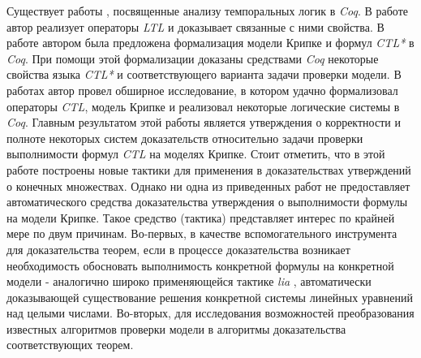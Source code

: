 \documentclass[12pt]{article}
\begin{document}
Существует работы \cite{2007}\cite{thesis}\cite{2003}, посвященные анализу темпоральных логик в \textit{Coq}.
В работе \cite{2003} автор реализует операторы \textit{LTL} и доказывает связанные с ними свойства. 
В работе \cite{2007} автором была предложена формализация модели Крипке и формул \textit{CTL*} в \textit{Coq}. При помощи этой формализации доказаны средствами \textit{Coq} некоторые свойства языка \textit{CTL*} и соответствующего варианта задачи проверки модели. 
В работах \cite{thesis}\cite{thesis_article} автор провел обширное исследование, в котором удачно формализовал операторы \textit{CTL}, модель Крипке и реализовал некоторые логические системы в \textit{Coq}. Главным результатом этой работы является утверждения о корректности и полноте некоторых систем доказательств относительно задачи проверки выполнимости формул \textit{CTL} на моделях Крипке. 
Стоит отметить, что в этой работе построены новые тактики для применения в доказательствах утверждений о конечных множествах. Однако ни одна из приведенных работ не предоставляет автоматического средства доказательства утверждения о выполнимости формулы на модели Крипке.
Такое средство (тактика) представляет интерес по крайней мере по двум причинам. Во-первых, в качестве вспомогательного инструмента для доказательства теорем, если в процессе доказательства возникает необходимость обосновать выполнимость конкретной формулы на конкретной модели - аналогично широко применяющейся тактике \textit{lia} \cite{micromega}, автоматически доказывающей существование решения конкретной системы линейных уравнений над целыми числами. Во-вторых, для исследования возможностей преобразования известных алгоритмов проверки модели в алгоритмы доказательства соответствующих теорем.







\end{document}
